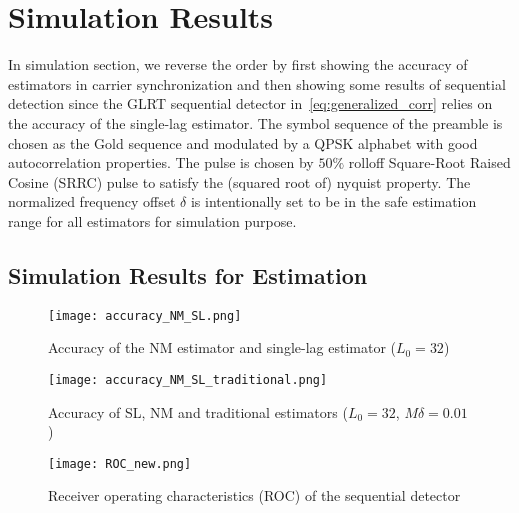 \section{Simulation Results}%
\label{sec:simulations}

In simulation section, we reverse the order by first showing the accuracy of estimators in carrier synchronization
and then showing some results of sequential detection since the GLRT sequential detector in~\eqref{eq:generalized_corr} relies on the accuracy of 
the single-lag estimator. The symbol sequence of the preamble is chosen as the Gold sequence and
modulated by a QPSK alphabet with good autocorrelation properties. The pulse is chosen
by $50\%$ rolloff Square-Root Raised Cosine (SRRC) pulse to satisfy the (squared root of) nyquist property.
The normalized frequency offset $\delta$ is intentionally set to be in the safe estimation range for all estimators for simulation purpose.

\subsection{Simulation Results for Estimation}

\begin{figure}[t]
    \centerline{\texttt{[image: accuracy\_NM\_SL.png]}}
    \caption{Accuracy of the NM estimator and single-lag estimator ($L_0=32$)}
    \label{fig:accuracy_NM_SL}
    \end{figure}

\begin{figure}[t]
    \centerline{\texttt{[image: accuracy\_NM\_SL\_traditional.png]}}
    \caption{Accuracy of SL, NM and traditional estimators ($L_0=32$, $M\delta=0.01$)}
    \label{fig:accuracy_NM_SL_traditional}
    \end{figure}


\begin{figure}[t]
    \centerline{\texttt{[image: ROC\_new.png]}}
    \caption{Receiver operating characteristics (ROC) of the sequential detector}
    \label{fig:Receiver operating characteristics}
    \end{figure}


